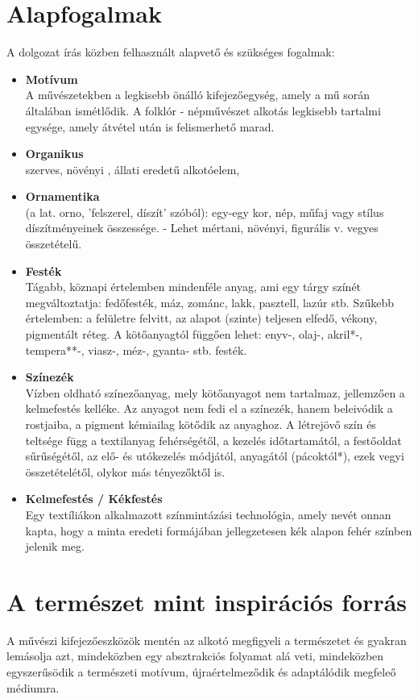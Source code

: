 \documentclass[fontsize=12pt, appendixprefix=true]{scrreprt}
\begin{document}
\section{Alapfogalmak}
A dolgozat írás közben felhasznált alapvető és szükséges fogalmak:
\begin{itemize}
	\item \textbf{Motívum} \\  A művészetekben a legkisebb önálló kifejezőegység, amely a mű során általában ismétlődik. A folklór - népművészet alkotás legkisebb tartalmi egysége, amely átvétel után is felismerhető marad.
	\item \textbf{Organikus} \\ szerves, növényi , állati eredetű alkotóelem, 
	\item \textbf{Ornamentika} \\ (a lat. orno, 'felszerel, díszít' szóból): egy-egy kor, nép, műfaj vagy stílus díszítményeinek összessége. - Lehet mértani, növényi, figurális v. vegyes összetételű.
	\item \textbf{Festék} \\ Tágabb, köznapi értelemben mindenféle anyag, ami egy tárgy színét megváltoztatja: fedőfesték, máz, zománc, lakk, pasztell, lazúr stb. Szűkebb értelemben: a felületre felvitt, az alapot (szinte) teljesen elfedő, vékony, pigmentált réteg. A kötőanyagtól függően lehet: enyv-, olaj-, akril*-, tempera**-, viasz-, méz-, gyanta- stb. festék.
	\item \textbf{Színezék} \\
	Vízben oldható színezőanyag, mely kötőanyagot nem tartalmaz, jellemzően a kelmefestés kelléke. Az anyagot nem fedi el a színezék, hanem beleivódik a rostjaiba, a pigment kémiailag kötődik az anyaghoz. A létrejövő szín és teltsége függ a textilanyag fehérségétől, a kezelés időtartamától, a festőoldat sűrűségétől, az elő- és utókezelés módjától, anyagától (pácoktól*), ezek vegyi összetételétől, olykor más tényezőktől is.
	\item \textbf{Kelmefestés / Kékfestés} \\ 
	Egy textíliákon alkalmazott színmintázási technológia, amely nevét onnan kapta, hogy a minta eredeti formájában jellegzetesen kék alapon fehér színben jelenik meg.
	\end{itemize}

\section{A természet mint  inspirációs forrás}
A művészi kifejezőeszközök mentén az alkotó megfigyeli a természetet és gyakran lemásolja azt, mindeközben egy absztrakciós folyamat alá veti, mindeközben egyszerűsödik a természeti motívum, újraértelmeződik és adaptálódik megfeleő médiumra.
\end{document}
